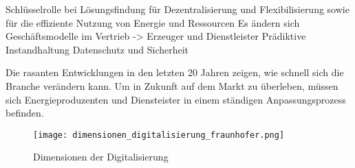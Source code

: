 Schlüsselrolle bei Lösungsfindung für Dezentralisierung und Flexibilisierung sowie für die effiziente Nutzung von Energie und Ressourcen \citep{FraunhoferISE}
Es ändern sich Geschäftsmodelle im Vertrieb -> Erzeuger und Dienstleister
Prädiktive Instandhaltung
Datenschutz und Sicherheit


Die rasanten Entwicklungen in den letzten 20 Jahren zeigen, wie schnell sich die Branche verändern kann. Um in Zukunft auf dem Markt zu überleben, müssen sich Energieproduzenten und Diensteister in einem ständigen Anpassungsprozess befinden.


\begin{figure}[h]
  \texttt{[image: dimensionen\_digitalisierung\_fraunhofer.png]}
  \caption[Dimensionen der Digitalisierung]{Dimensionen der Digitalisierung \citep{FraunhoferISE}}
\end{figure}


